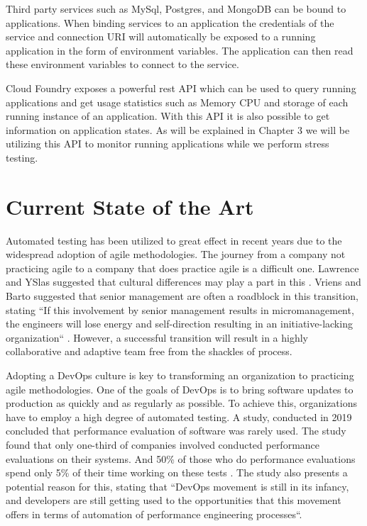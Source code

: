 Third party services such as MySql, Postgres, and MongoDB can be bound to applications. When binding services to an application the credentials of the service and connection URI will automatically be exposed to a running application in the form of environment variables. The application can then read these environment variables to connect to the service.

Cloud Foundry exposes a powerful rest API which can be used to query running applications and get usage statistics such as Memory CPU and storage of each running instance of an application. With this API it is also possible to get information on application states. As will be explained in Chapter 3 we will be utilizing this API to monitor running applications while we perform stress testing.

\section{Current State of the Art}

Automated testing has been utilized to great effect in recent years due to the widespread adoption of agile methodologies. The journey from a company not practicing agile to a company that does practice agile is a difficult one. Lawrence and YSlas suggested that cultural differences may play a part in this \cite{1667587}. Vriens and Barto suggested that senior management are often a roadblock in this transition, stating ``If this involvement by senior management results in micromanagement, the engineers will lose energy and self-direction resulting in an initiative-lacking organization`` \cite{4599511}. However, a successful transition will result in a highly collaborative and adaptive team free from the shackles of process.

Adopting a DevOps culture is key to transforming an organization to practicing agile methodologies. One of the goals of DevOps is to bring software updates to production as quickly and as regularly as possible. To achieve this, organizations have to employ a high degree of automated testing. A study, conducted in 2019 concluded that performance evaluation of software was rarely used. The study found that only one-third of companies involved conducted performance evaluations on their systems. And 50\% of those who do performance evaluations spend only 5\% of their time working on these tests \cite{bezemer2019performance}. The study also presents a potential reason for this, stating that ``DevOps movement is
still in its infancy, and developers are still getting used to the opportunities that this movement offers in terms of automation of
performance engineering processes``.

